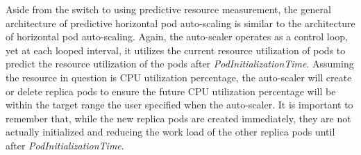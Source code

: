 Aside from the switch to using predictive resource measurement, the
general architecture of predictive horizontal pod auto-scaling is similar to the
architecture of horizontal pod auto-scaling. Again, the auto-scaler operates as a
control loop, yet at each looped interval, it utilizes the current resource
utilization of pods to predict the resource utilization of the pods after
\textit{PodInitializationTime}. Assuming the resource in question is CPU
utilization percentage, the auto-scaler will create or delete replica pods
to ensure the future CPU utilization percentage will be within the target range
the user specified when the auto-scaler. It is important to remember that, while
the new replica pods are created immediately, they are not actually initialized
and reducing the work load of the other replica pods until after
\textit{PodInitializationTime}.

